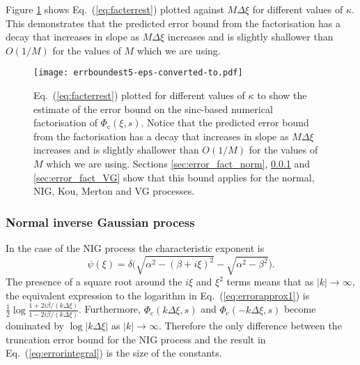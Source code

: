 \documentclass[11pt,a4paper]{article}
\begin{document}
Figure \ref{fig:errboundest} shows Eq.~(\ref{eq:facterrest}) plotted against $M\Delta\xi$ for different values of $\kappa$. This demonstrates that the predicted error bound from the factorisation has a decay that increases in slope as $M\Delta\xi$ increases and is slightly shallower than $O(1/M)$ for the values of $M$ which we are using.
\begin{figure}
\begin{center}
\texttt{[image: errboundest5-eps-converted-to.pdf]}
\caption{Eq.~(\ref{eq:facterrest}) plotted for different values of $\kappa$ to show the estimate of the error bound on the sinc-based numerical factorisation of $\Phi_{\mathrm{c}}(\xi,s)$. Notice that the predicted error bound from the factorisation has a decay that increases in slope as $M\Delta\xi$ increases and is slightly shallower than $O(1/M)$ for the values of $M$ which we are using. Sections \ref{sec:error_fact_norm}, \ref{sec:error_fact_NIG} and \ref{sec:error_fact_VG} show that this bound applies for the normal, NIG, Kou, Merton and VG processes.}
\label{fig:errboundest}
\end{center}
\end{figure}

\subsubsection{Normal inverse Gaussian process}\label{sec:error_fact_NIG}

In the case of the NIG process the characteristic exponent is
\begin{equation}
\psi(\xi)=\delta\big(\sqrt{\alpha^2-(\beta+i\xi)^2}-\sqrt{\alpha^2-\beta^2}\big).
\end{equation}
The presence of a square root around the $i\xi$ and $\xi^{2}$ terms means that as $|k|\!\rightarrow\!\infty$, the equivalent expression to the logarithm in Eq.~(\ref{eq:errorapprox1}) is $\frac{1}{2}\log\frac{1+2i\beta/(k\Delta\xi )}{1-2i\beta/(k\Delta\xi )}$. Furthermore, $\Phi_{\mathrm{c}}(k\Delta\xi,s)$ and $\Phi_{\mathrm{c}}(-k\Delta\xi,s)$ become dominated by $\log|k\Delta\xi|$ as $|k|\rightarrow\infty$. Therefore the only difference between the truncation error bound for the NIG process and the result in Eq.~(\ref{eq:errorintegral}) is the size of the constants.

\end{document}
